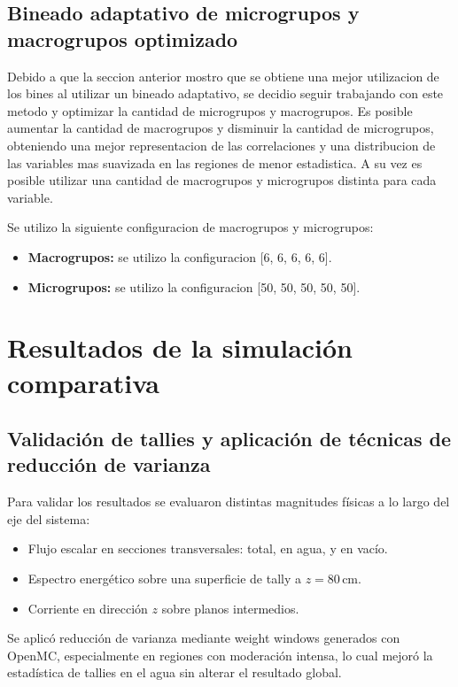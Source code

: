\subsection{Bineado adaptativo de microgrupos y macrogrupos optimizado}
Debido a que la seccion anterior mostro que se obtiene una mejor utilizacion de los bines al utilizar un bineado adaptativo, se decidio seguir trabajando con este metodo y optimizar la cantidad de microgrupos y macrogrupos. Es posible aumentar la cantidad de macrogrupos y disminuir la cantidad de microgrupos, obteniendo una mejor representacion de las correlaciones y una distribucion de las variables mas suavizada en las regiones de menor estadistica. A su vez es posible utilizar una cantidad de macrogrupos y microgrupos distinta para cada variable. 

Se utilizo la siguiente configuracion de macrogrupos y microgrupos:
\begin{itemize}
    \item \textbf{Macrogrupos:} se utilizo la configuracion [6, 6, 6, 6, 6].
    \item \textbf{Microgrupos:} se utilizo la configuracion [50, 50, 50, 50, 50].
\end{itemize}

\section{Resultados de la simulación comparativa}
\subsection{Validación de tallies y aplicación de técnicas de reducción de varianza}

Para validar los resultados se evaluaron distintas magnitudes físicas a lo largo del eje del sistema:

\begin{itemize}
    \item Flujo escalar en secciones transversales: total, en agua, y en vacío.
    \item Espectro energético sobre una superficie de tally a $z = 80\,\text{cm}$.
    \item Corriente en dirección $z$ sobre planos intermedios.
\end{itemize}

Se aplicó reducción de varianza mediante weight windows generados con OpenMC, especialmente en regiones con moderación intensa, lo cual mejoró la estadística de tallies en el agua sin alterar el resultado global.


